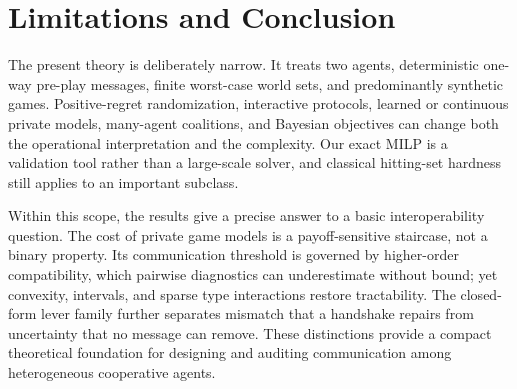 \documentclass[letterpaper]{article} %
\begin{document}
\section{Limitations and Conclusion}

The present theory is deliberately narrow. It treats two agents, deterministic
one-way pre-play messages, finite worst-case world sets, and predominantly
synthetic games. Positive-regret randomization, interactive protocols, learned
or continuous private models, many-agent coalitions, and Bayesian objectives
can change both the operational interpretation and the complexity. Our exact
MILP is a validation tool rather than a large-scale solver, and classical
hitting-set hardness still applies to an important subclass.

Within this scope, the results give a precise answer to a basic interoperability
question. The cost of private game models is a payoff-sensitive staircase, not
a binary property. Its communication threshold is governed by higher-order
compatibility, which pairwise diagnostics can underestimate without bound; yet
convexity, intervals, and sparse type interactions restore tractability. The
closed-form lever family further separates mismatch that a handshake repairs
from uncertainty that no message can remove. These distinctions provide a
compact theoretical foundation for designing and auditing communication among
heterogeneous cooperative agents.


\end{document}
